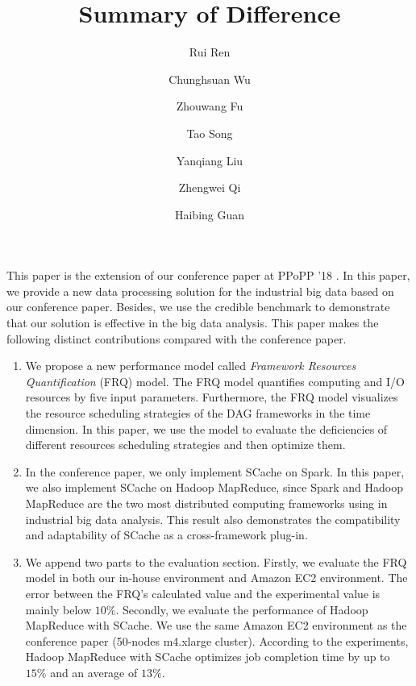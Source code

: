 \documentclass[12pt,reqno]{amsart}
\title{Summary of Difference}
\author{Rui Ren}
\author{Chunghsuan Wu}
\author{Zhouwang Fu}
\author{Tao Song}
\author{Yanqiang Liu}
\author{Zhengwei Qi}
\author{Haibing Guan}
\theoremstyle{plain}
\numberwithin{equation}{section}
\theoremstyle{plain}
\numberwithin{equation}{section}
\begin{document}
\maketitle



This paper is the extension of our conference paper at PPoPP '18 \cite{fu2018efficient}. 
In this paper, we provide a new data processing solution for the industrial big data based on our conference paper.
Besides, we use the credible benchmark to demonstrate that our solution is effective in the big data analysis.
This paper makes the following distinct contributions compared with the conference paper.

\begin{enumerate}
\item 
We propose a new performance model called \textit{Framework Resources Quantification} (FRQ) model.
The FRQ model quantifies computing and I/O resources by five input parameters. 
Furthermore, the FRQ model visualizes the resource scheduling strategies of the DAG frameworks in the time dimension. 
In this paper, we use the model to evaluate the deficiencies of different resources scheduling strategies and then optimize them.
\item 
In the conference paper, we only implement SCache on Spark. 
In this paper, we also implement SCache on Hadoop MapReduce, since Spark and Hadoop MapReduce are the two most distributed computing frameworks using in industrial big data analysis.
This result also demonstrates the compatibility and adaptability of SCache as a cross-framework plug-in.
\item
We append two parts to the evaluation section. 
Firstly, we evaluate the FRQ model in both our in-house environment and Amazon EC2 environment. The error between the FRQ’s calculated value and the experimental value is mainly below $10\%$. 
Secondly, we evaluate the performance of Hadoop MapReduce with SCache. We use the same Amazon EC2 environment as the conference paper (50-nodes m4.xlarge cluster).
According to the experiments, Hadoop MapReduce with SCache optimizes job completion time by up to $15\%$ and an average of $13\%$.
\end{enumerate}
\end{document}
